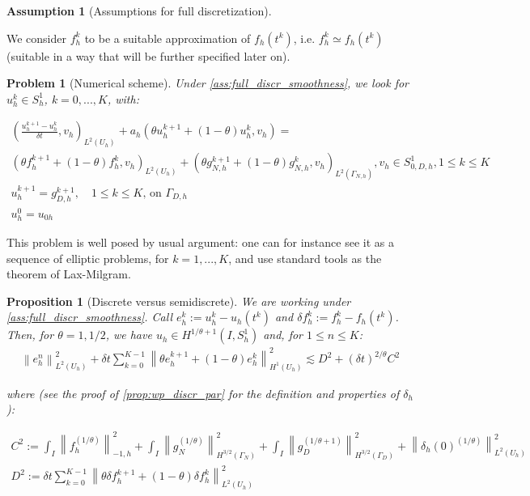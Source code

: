 \documentclass[english,a4paper,10pt,oneside]{scrbook}	%
\theoremstyle{break}
\newtheorem{prop}[equation]{Proposition}
\newtheorem{ass}[equation]{Assumption}
\newtheorem{pb}[equation]{Problem}
\theoremstyle{remark}
\newcommand{\ds}{\displaystyle}
\newcommand{\norm}[1]{\left\lVert#1\right\rVert}
\begin{document}
\begin{appendices}
\begin{ass}[Assumptions for full discretization]
\end{ass}

We consider $f_h^k$ to be a suitable approximation of $f_h(t^k)$, i.e. $f_h^k \simeq f_h(t^k)$ (suitable in a way that will be further specified later on).

\begin{pb}[Numerical scheme]
\label{pb:num_scheme}
Under \cref{ass:full_discr_smoothness}, we look for $u_h^k \in S^1_h$, $k=0,...,K$, with:

\begin{align*}
\left ( \frac{u_{h}^{k+1}-u_h^k}{\delta t}, v_h\right)_{L^2(U_h)} + a_h(\theta u_h^{k+1}+(1-\theta)u^k_h, v_h) =\\(\theta f_h^{k+1}+(1-\theta)f_h^k, v_h)_{L^2(U_h)} + (\theta g_{N,h}^{k+1} + (1 - \theta)g_{N,h}^{k} , v_h)_{L^2(\Gamma_{N,h})}, v_h \in S^1_{0,D,h}, 1\leq k \leq K\\
u_h^{k+1}=g_{D,h}^{k+1},\quad 1\leq k \leq K \text{,  on } \Gamma_{D,h}\\
u_h^0=u_{0h}
\end{align*}

\end{pb}

This problem is well posed by usual argument: one can for instance see it as a sequence of elliptic problems, for $k = 1, ..., K$, and use standard tools as the theorem of Lax-Milgram.

\begin{prop}[Discrete versus semidiscrete]
\label{prop:d_vd_sd}
We are working under \cref{ass:full_discr_smoothness}.
Call $e_h^k:=u_h^k-u_h(t^k)$ and $\delta f_h^k:=f_h^k-f_h(t^k)$. Then, for $\theta=1, 1/2$, we have $u_h \in H^{1/\theta+1}(I, S^1_h)$ and, for $1\leq n \leq K$:
\begin{align*}
 \norm{e_{h}^{n}}_{L^2(U_h)}^2 + \delta t \sum_{k=0}^{K-1}\norm{\theta e_h^{k+1}+(1-\theta)e^k_h}_{H^1(U_h)}^2 \lesssim 
D^2 + (\delta t)^{2/\theta} C^2
\end{align*}

where (see the proof of \cref{prop:wp_discr_par} for the definition and properties of $\delta_h$):

\begin{align*}
C^2:=\ds \int_I \norm{f^{(1/\theta)}_h}_{-1,h}^2+\int_I\norm{ g_{N}^{(1/\theta)}}_{H^{3/2}(\Gamma_{N})}^2 + \int_I\norm{g_D^{(1/\theta+1)}}_{H^{3/2}(\Gamma_D)}^2 + \norm{\delta_{h}(0)^{(1/\theta)}}_{L^2(U_h)}^2\\
\ds D^2:= \ds {\delta t\sum_{k=0}^{K-1} \norm{\theta \delta f_h^{k+1}+(1-\theta)\delta f_h^k}_{L^2(U_h)}^2}
\end{align*}
\end{prop}


\end{appendices}
\end{document}
